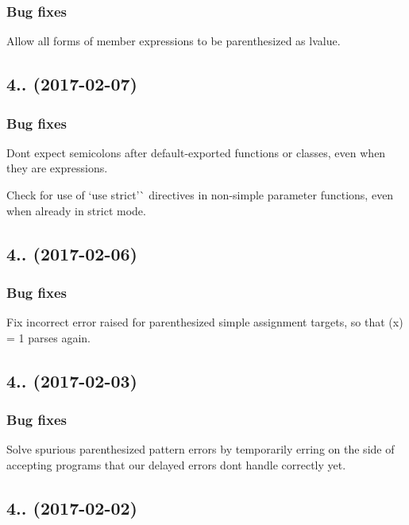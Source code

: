 \subsubsection*{Bug fixes}

Allow all forms of member expressions to be parenthesized as lvalue.

\subsection*{4.. (2017-\/02-\/07)}

\subsubsection*{Bug fixes}

Don\textquotesingle{}t expect semicolons after default-\/exported functions or classes, even when they are expressions.

Check for use of `\textquotesingle{}use strict'\`{} directives in non-\/simple parameter functions, even when already in strict mode.

\subsection*{4.. (2017-\/02-\/06)}

\subsubsection*{Bug fixes}

Fix incorrect error raised for parenthesized simple assignment targets, so that {\ttfamily (x) = 1} parses again.

\subsection*{4.. (2017-\/02-\/03)}

\subsubsection*{Bug fixes}

Solve spurious parenthesized pattern errors by temporarily erring on the side of accepting programs that our delayed errors don\textquotesingle{}t handle correctly yet.

\subsection*{4.. (2017-\/02-\/02)}

